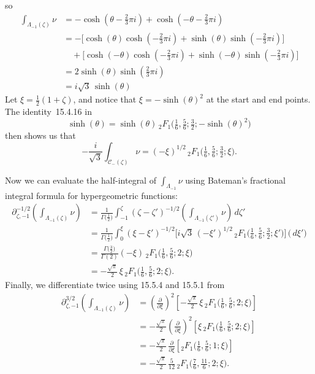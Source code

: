 \documentclass{article}
\newcommand{\fracderiv}[3]{\partial^{#1}_{#2, #3}}
\theoremstyle{definition}
\theoremstyle{plain}
\begin{document}
so
\begin{align*}
\int_{\Lambda_{-1}(\zeta)} \nu & =- \cosh(\theta - \tfrac{2}{3}\pi i) + \cosh(-\theta - \tfrac{2}{3}\pi i) \\
& =- \big[\cosh(\theta) \cosh(-\tfrac{2}{3}\pi i) + \sinh(\theta) \sinh(-\tfrac{2}{3}\pi i)\big] \\
& \quad + \big[\cosh(-\theta) \cosh(-\tfrac{2}{3}\pi i) + \sinh(-\theta) \sinh(-\tfrac{2}{3}\pi i)\big] \\
& = 2\sinh(\theta) \sinh(\tfrac{2}{3}\pi i) \\
& = i\sqrt{3}\,\sinh(\theta)
\end{align*}
Let $\xi = \tfrac{1}{2}(1 + \zeta)$, and notice that $\xi =- \sinh( \theta)^2$ at the start and end points. The identity~15.4.16 in \cite{dlmf}
\[ \sinh(\theta) = \sinh(\theta)\, {}_2F_1\big(\tfrac{1}{6}, \tfrac{5}{6}; \tfrac{3}{2}; -\sinh(\theta)^2\big) \]
then shows us that
\[ -\frac{i}{\sqrt{3}} \int_{\mathcal{C}_-(\zeta)} \nu =  (-\xi)^{1/2}\, {}_2F_1\big(\tfrac{1}{6}, \tfrac{5}{6}; \tfrac{3}{2}; \xi\big). \]

Now we can evaluate the half-integral of $\int_{\Lambda_{-1}} \nu$ using Bateman's fractional integral formula for hypergeometric functions: \begin{align*}
\fracderiv{-1/2}{\zeta}{-1}\left( \int_{\Lambda_{-1}(\zeta)} \nu \right) & = \frac{1}{\Gamma\big(\tfrac{1}{2}\big)} \int_{-1}^\zeta (\zeta - \zeta')^{-1/2} \left( \int_{\Lambda_{-1}(\zeta')} \nu \right)\,d\zeta' \\
& = \frac{1}{\Gamma\big(\tfrac{1}{2}\big)} \int_0^\xi  (\xi - \xi')^{-1/2} \Big[{i}{\sqrt{3}}\, (-\xi')^{1/2}\, {}_2F_1\big(\tfrac{1}{6}, \tfrac{5}{6}; \tfrac{3}{2}; \xi' \big) \Big] \,\big( \,d\xi' \big) \\
& =  \frac{\Gamma\big(\tfrac{3}{2}\big)}{\Gamma(2)} (-\xi)\, {}_2F_1\big(\tfrac{1}{6}, \tfrac{5}{6}; 2; \xi\big) \\
& = - \tfrac{\sqrt{\pi}}{2}\,\xi\,{}_2F_1\big(\tfrac{1}{6}, \tfrac{5}{6}; 2; \xi\big).
\end{align*}
Finally, we differentiate twice using 15.5.4 and 15.5.1 from \cite{dlmf}
\begin{align*}
\fracderiv{3/2}{\zeta}{-1} \left( \int_{\Lambda_{-1}(\zeta)} \nu \right) & = \left(\tfrac{\partial}{\partial \xi}\right)^2 \left[ - \tfrac{\sqrt{\pi}}{2} \,\xi\, {}_2F_1\big(\tfrac{1}{6}, \tfrac{5}{6}; 2; \xi\big) \right] \\
& = - \tfrac{\sqrt{\pi}}{2} \left(\tfrac{\partial}{\partial \xi}\right)^2 \left[ \xi\, {}_2F_1\big(\tfrac{1}{6}, \tfrac{5}{6}; 2; \xi\big) \right] \\
& = - \tfrac{\sqrt{\pi}}{2}\,\tfrac{\partial}{\partial \xi} \left[ {}_2F_1\big(\tfrac{1}{6}, \tfrac{5}{6}; 1; \xi\big) \right] \\
& = - \tfrac{\sqrt{\pi}}{2}\,\tfrac{5}{12}\, {}_2F_1\big(\tfrac{7}{6}, \tfrac{11}{6}; 2; \xi\big).
\end{align*}
\end{document}
